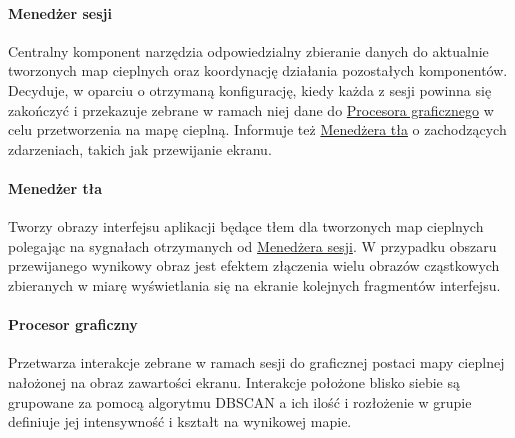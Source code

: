 \paragraph{Menedżer sesji} 
\label{par:rs_session_manager}
Centralny komponent narzędzia odpowiedzialny zbieranie danych do aktualnie tworzonych map cieplnych oraz koordynację działania pozostałych komponentów. Decyduje, w oparciu o otrzymaną konfigurację, kiedy każda z sesji powinna się zakończyć i przekazuje zebrane w ramach niej dane do  \hyperref[par:rs_graphical_processor]{Procesora graficznego} w celu przetworzenia na mapę cieplną. Informuje też \hyperref[par:rs_bg_manager]{Menedżera tła} o zachodzących zdarzeniach, takich jak przewijanie ekranu.

\paragraph{Menedżer tła} 
\label{par:rs_bg_manager}
Tworzy obrazy interfejsu aplikacji będące tłem dla tworzonych map cieplnych polegając na sygnałach otrzymanych od \hyperref[par:rs_session_manager]{Menedżera sesji}. W przypadku obszaru przewijanego wynikowy obraz jest efektem złączenia wielu  obrazów cząstkowych zbieranych w miarę wyświetlania się na ekranie kolejnych fragmentów interfejsu.

\paragraph{Procesor graficzny} 
\label{par:rs_graphical_processor}
Przetwarza interakcje zebrane w ramach sesji do graficznej postaci mapy cieplnej nałożonej na obraz zawartości ekranu. Interakcje położone blisko siebie są grupowane za pomocą algorytmu DBSCAN \cite{DBSCAN_Wiki} a ich ilość i rozłożenie w grupie definiuje jej intensywność i kształt na wynikowej mapie.
